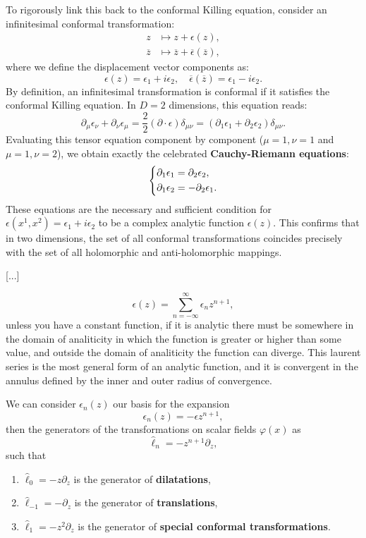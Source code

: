 To rigorously link this back to the conformal Killing equation, consider an infinitesimal conformal transformation:
\[
    \begin{aligned}
        z            & \mapsto z + \epsilon(z),                                  \\
        \overline{z} & \mapsto \overline{z} + \overline{\epsilon}(\overline{z}),
    \end{aligned}
\]
where we define the displacement vector components as:
\[
    \epsilon(z) = \epsilon_1 + i \epsilon_2, \quad \overline{\epsilon}(\overline{z}) = \epsilon_1 - i \epsilon_2.
\]
By definition, an infinitesimal transformation is conformal if it satisfies the conformal Killing equation. In \(D=2\) dimensions, this equation reads:
\[
    \partial_\mu \epsilon_\nu + \partial_\nu \epsilon_\mu = \frac{2}{2} (\partial \cdot \epsilon) \delta_{\mu\nu} = (\partial_1\epsilon_1 + \partial_2\epsilon_2) \delta_{\mu\nu}.
\]
Evaluating this tensor equation component by component (\(\mu=1, \nu=1\) and \(\mu=1, \nu=2\)), we obtain exactly the celebrated \textbf{Cauchy-Riemann equations}:
\[
    \begin{dcases}
        \partial_1 \epsilon_1 = \partial_2 \epsilon_2, \\
        \partial_1 \epsilon_2 = -\partial_2 \epsilon_1.
    \end{dcases}
\]
These equations are the necessary and sufficient condition for \(\epsilon(x^1, x^2) = \epsilon_1 + i \epsilon_2\) to be a complex analytic function \(\epsilon(z)\). This confirms that in two dimensions, the set of all conformal transformations coincides precisely with the set of all holomorphic and anti-holomorphic mappings.

    [...]

\[
    \epsilon(z) = \sum_{n = -\infty}^{\infty} \epsilon_n z^{n + 1},
\]
unless you have a constant function, if it is analytic there must be somewhere in the domain of analiticity in which the function is greater or higher than some value, and outside the domain of analiticity the function can diverge. This laurent series is the most general form of an analytic function, and it is convergent in the annulus defined by the inner and outer radius of convergence.

We can consider \(\epsilon_n(z)\) our basis for the expansion
\[
    \epsilon_n(z) = - \epsilon z^{n + 1},
\]
then the generators of the transformations on scalar fields \(\varphi(x)\) as
\[
    \hat{\ell}_n = - z^{n + 1} \partial_z,
\]
such that
\begin{enumerate}
    \item \(\hat{\ell}_0 = -z \partial_z\) is the generator of \textbf{dilatations},
    \item \(\hat{\ell}_{-1} = -\partial_z\) is the generator of \textbf{translations},
    \item \(\hat{\ell}_1 = -z^2 \partial_z\) is the generator of \textbf{special conformal transformations}.
\end{enumerate}

